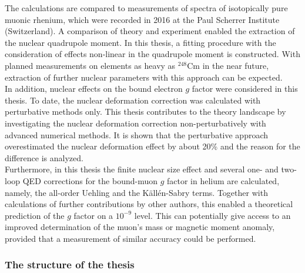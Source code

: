 The calculations are compared to measurements of spectra of isotopically pure muonic rhenium, which were recorded in 2016 at the Paul Scherrer Institute (Switzerland). A comparison of theory and experiment enabled the extraction of the nuclear quadrupole moment. In this thesis, a fitting procedure with the consideration of effects non-linear in the quadrupole moment is constructed.
With planned measurements on elements as heavy as $^{248}\text{Cm}$ in the near future, extraction of further nuclear parameters with this approach can be expected.\\[11pt]%
In addition, nuclear effects on the bound electron $g$ factor were considered in this thesis. To date, the nuclear deformation correction was calculated with perturbative methods only. This thesis contributes to the theory landscape by investigating the nuclear deformation correction non-perturbatively with advanced numerical methods. It is shown that the perturbative approach overestimated the nuclear deformation effect by about 20\% and the reason for the difference is analyzed.\\[11pt]%
Furthermore, in this thesis the finite nuclear size effect and several one- and two-loop QED corrections for the bound-muon $g$ factor in helium are calculated, namely, the all-order Uehling and the Källén-Sabry terms. Together with calculations of further contributions by other authors, this enabled a theoretical prediction of the $g$ factor on a $10^{-9}$ level. This can potentially give access to an improved determination of the muon's mass or magnetic moment anomaly, provided that a measurement of similar accuracy could be performed.


\subsubsection*{The structure of the thesis}

